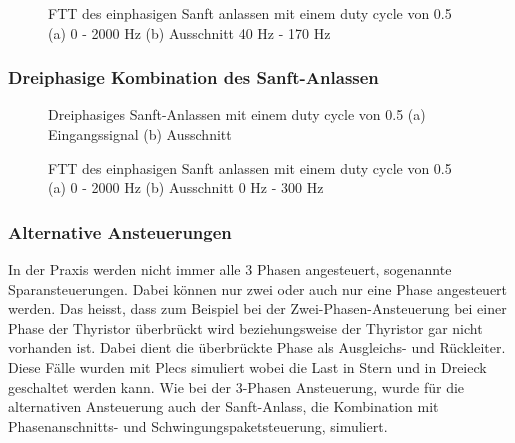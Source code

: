 \begin{figure}[ht!]
	\centering
	\qquad
	\caption{FTT des einphasigen Sanft anlassen mit einem duty cycle von 0.5 (a) 0 - 2000 Hz (b) Ausschnitt 40 Hz - 170 Hz}
	\label{fig:einphasiges_Sanft_anlassen_FTT}
\end{figure}




\subsubsection{Dreiphasige Kombination des Sanft-Anlassen}


\begin{figure}[ht!]
	\centering
	\qquad
	\caption{Dreiphasiges Sanft-Anlassen mit einem duty cycle von 0.5 (a) Eingangssignal (b) Ausschnitt}
	\label{fig:drei_phasiges_Sanft_anlassen}
\end{figure}

\begin{figure}[ht!]
	\centering
	\qquad
	\caption{FTT des einphasigen Sanft anlassen mit einem duty cycle von 0.5 (a) 0 - 2000 Hz (b) Ausschnitt 0 Hz - 300 Hz}
	\label{fig:dreiphasiges_Sanft_anlassen_FTT}
\end{figure}





\newpage

\subsubsection{Alternative Ansteuerungen}
In der Praxis werden nicht immer alle 3 Phasen angesteuert, sogenannte Sparansteuerungen. Dabei können nur zwei oder auch nur eine Phase angesteuert werden. Das heisst, dass zum Beispiel bei der Zwei-Phasen-Ansteuerung bei einer Phase der Thyristor überbrückt wird beziehungsweise der Thyristor gar nicht vorhanden ist. Dabei dient die überbrückte Phase als Ausgleichs- und Rückleiter. Diese Fälle wurden mit Plecs simuliert wobei die Last in Stern und in Dreieck geschaltet werden kann. Wie bei der 3-Phasen Ansteuerung, wurde für die alternativen Ansteuerung auch der Sanft-Anlass, die Kombination mit Phasenanschnitts- und Schwingungspaketsteuerung, simuliert.

